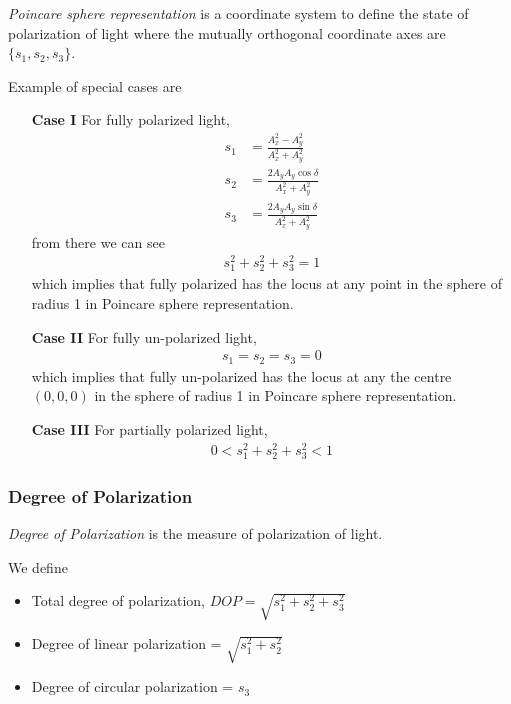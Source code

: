 \documentclass[11pt,a4paper]{article}
\numberwithin{equation}{section}
\begin{document}
\textit{Poincare sphere representation} is a coordinate system to define the state of polarization of light where the mutually orthogonal coordinate axes are $\{ s_1, s_2, s_3 \}$.
\begin{center}
	\label{fig:poincare}
\end{center}

Example of special cases are
\begin{enumerate}
	\item[\textbf{Case I}] For fully polarized light,
	\begin{align}
		s_1&=\frac{A_x^2 - A_y^2}{A_x^2 + A_y^2}\\
		s_2&=\frac{2A_yA_y\cos\delta}{A_x^2 + A_y^2}\\
		s_3&=\frac{2A_yA_y\sin\delta}{A_x^2 + A_y^2}
	\end{align}
from there we can see
\begin{align}
	s_1^2+s_2^2+s_3^2=1 \label{eq:1.29}
\end{align}
which implies that fully polarized has the locus at any point in the sphere of radius 1 in Poincare sphere representation.

\item[\textbf{Case II}] For fully un-polarized light,
\begin{align}
	s_1=s_2=s_3=0
\end{align}
which implies that fully un-polarized has the locus at any the centre $(0,0,0)$ in the sphere of radius 1 in Poincare sphere representation.

\item[\textbf{Case III}] For partially polarized light,
\begin{align}
	0<s_1^2+s_2^2+s_3^2<1
\end{align}
\end{enumerate}

\subsubsection{Degree of Polarization}
\textit{Degree of Polarization} is the measure of polarization of light.

We define
\begin{itemize}
	\item Total degree of polarization, $DOP = \sqrt{s_1^2+s_2^2+s_3^2}$
	\item Degree of linear polarization = $\sqrt{s_1^2+s_2^2}$
	\item Degree of circular polarization = $s_3$
\end{itemize}
\end{document}
